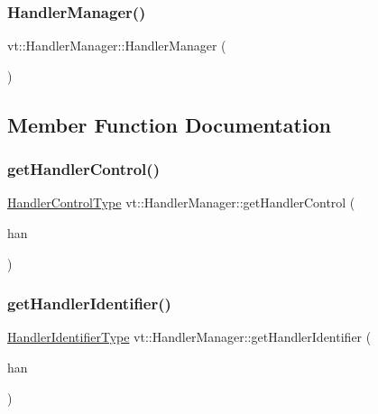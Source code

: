 \subsubsection{\texorpdfstring{Handler\+Manager()}{HandlerManager()}}
{\footnotesize\ttfamily vt\+::\+Handler\+Manager\+::\+Handler\+Manager (\begin{DoxyParamCaption}{ }\end{DoxyParamCaption})\hspace{0.3cm}{\ttfamily [default]}}



\subsection{Member Function Documentation}
\mbox{\label{structvt_1_1_handler_manager_a90bf2b080d44af243e5a35bf8836d161}} 
\subsubsection{\texorpdfstring{get\+Handler\+Control()}{getHandlerControl()}}
{\footnotesize\ttfamily \hyperlink{namespacevt_adbbef13b92f0a93b14c219b7cc8a48f2}{Handler\+Control\+Type} vt\+::\+Handler\+Manager\+::get\+Handler\+Control (\begin{DoxyParamCaption}\item[{\hyperlink{namespacevt_af64846b57dfcaf104da3ef6967917573}{Handler\+Type}}]{han }\end{DoxyParamCaption})\hspace{0.3cm}{\ttfamily [static]}}

\mbox{\label{structvt_1_1_handler_manager_a1fc8635a26795f11f16f47eaf74b25a7}} 
\subsubsection{\texorpdfstring{get\+Handler\+Identifier()}{getHandlerIdentifier()}}
{\footnotesize\ttfamily \hyperlink{namespacevt_a59ae068fe828d1c33051ff96f3d016b6}{Handler\+Identifier\+Type} vt\+::\+Handler\+Manager\+::get\+Handler\+Identifier (\begin{DoxyParamCaption}\item[{\hyperlink{namespacevt_af64846b57dfcaf104da3ef6967917573}{Handler\+Type}}]{han }\end{DoxyParamCaption})\hspace{0.3cm}{\ttfamily [static]}}

